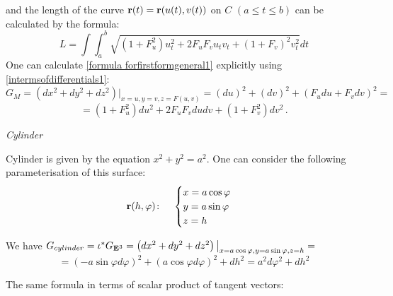 \documentclass[12pt]{article}
\theoremstyle{theorem}
\numberwithin{equation}{section}
\begin{document}
  and the length of the curve ${\bf r}(t)={\bf r} (u(t), v(t))$ on $C$  $(a\leq t\leq b)$
  can be calculated by the formula:
               \begin{equation*}
             L=\int
             \int_a^b\sqrt{(1+F_u^2)u_t^2+2F_uF_vu_tv_t+(1+F_v)^2v^2_t}dt
               \end{equation*}
One can calculate \eqref{formula forfirstformgeneral1} explicitly using \eqref{intermsofdifferentials1}:
                     $$
                                    G_M=\left(dx^2+dy^2+dz^2\right)\big\vert_{x=u,y=v,z=F(u,v)}=
               (du)^2+(dv)^2+(F_udu+F_vdv)^2=
                     $$
               \begin{equation}\label{formula forfirstformgeneral2}
=(1+F_u^2)du^2+2F_uF_vdudv+(1+F_v^2)dv^2\,.
               \end{equation}



\medskip

         \medskip


       \centerline  {\it Cylinder}


  Cylinder is given by the equation $x^2+y^2=a^2$. One can consider the following
parameterisation
 of this surface:
\begin{equation}\label{surface1}
  {\bf r}(h,\varphi)\colon\quad
  \begin{cases}
  x=a\cos\varphi\\
  y=a\sin\varphi\\
  z=h\\
  \end{cases}
\end{equation}

\medskip

We have   $G_{cylinder}=\iota^*G_{{\bf E}^3}=\left(dx^2+dy^2+dz^2\right)
       \big\vert_{x=a\cos\varphi,y=a\sin\varphi,z=h}=$
        \begin{equation}\label{firstquadraticformcylinder}
               =(-a\sin\varphi d\varphi)^2+(a\cos\varphi
              d\varphi)^2+dh^2=a^2d\varphi^2+dh^2
        \end{equation}

The same formula in terms of scalar product of tangent vectors:
\end{document}
